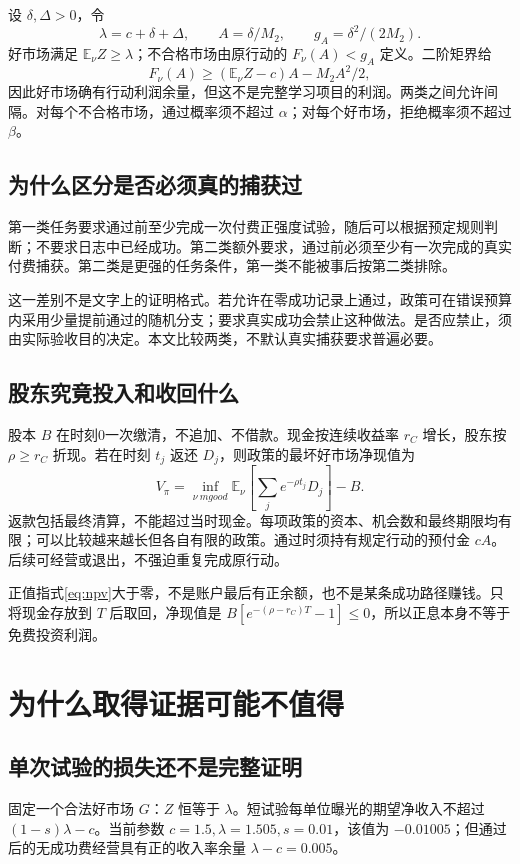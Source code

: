 \documentclass[UTF8,fontset=windows,11pt,a4paper]{ctexart}
\numberwithin{equation}{section}
\begin{document}
设 $\delta,\Delta>0$，令
\begin{equation}
 \lambda=c+\delta+\Delta,\qquad A=\delta/M_2,
 \qquad g_A=\delta^2/(2M_2).
\end{equation}
好市场满足 $\mathbb E_\nu Z\ge\lambda$；不合格市场由原行动的 $F_\nu(A)<g_A$ 定义。二阶矩界给
\begin{equation}
 F_\nu(A)\ge(\mathbb E_\nu Z-c)A-M_2A^2/2,
\end{equation}
因此好市场确有行动利润余量，但这不是完整学习项目的利润。两类之间允许间隔。对每个不合格市场，通过概率须不超过 $\alpha$；对每个好市场，拒绝概率须不超过 $\beta$。

\subsection{为什么区分是否必须真的捕获过}
第一类任务要求通过前至少完成一次付费正强度试验，随后可以根据预定规则判断；不要求日志中已经成功。第二类额外要求，通过前必须至少有一次完成的真实付费捕获。第二类是更强的任务条件，第一类不能被事后按第二类排除。

这一差别不是文字上的证明格式。若允许在零成功记录上通过，政策可在错误预算内采用少量提前通过的随机分支；要求真实成功会禁止这种做法。是否应禁止，须由实际验收目的决定。本文比较两类，不默认真实捕获要求普遍必要。

\subsection{股东究竟投入和收回什么}
股本 $B$ 在时刻0一次缴清，不追加、不借款。现金按连续收益率 $r_C$ 增长，股东按 $\rho\ge r_C$ 折现。若在时刻 $t_j$ 返还 $D_j$，则政策的最坏好市场净现值为
\begin{equation}\label{eq:npv}
 V_\pi=\inf_{\nu\ {
m good}}
 \mathbb E_\nu\left[\sum_j e^{-\rho t_j}D_j\right]-B.
\end{equation}
返款包括最终清算，不能超过当时现金。每项政策的资本、机会数和最终期限均有限；可以比较越来越长但各自有限的政策。通过时须持有规定行动的预付金 $cA$。后续可经营或退出，不强迫重复完成原行动。

正值指式\eqref{eq:npv}大于零，不是账户最后有正余额，也不是某条成功路径赚钱。只将现金存放到 $T$ 后取回，净现值是 $B[e^{-(\rho-r_C)T}-1]\le0$，所以正息本身不等于免费投资利润。

\section{为什么取得证据可能不值得}
\subsection{单次试验的损失还不是完整证明}
固定一个合法好市场 $G$：$Z$ 恒等于 $\lambda$。短试验每单位曝光的期望净收入不超过 $(1-s)\lambda-c$。当前参数 $c=1.5,\lambda=1.505,s=0.01$，该值为 $-0.01005$；但通过后的无成功费经营具有正的收入率余量 $\lambda-c=0.005$。
\end{document}
